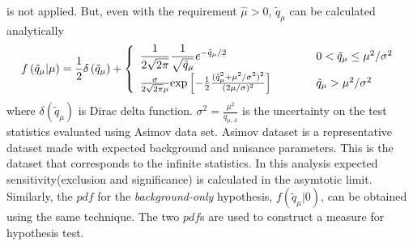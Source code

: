 \begin{itemize}
is not applied. But, even with the requirement $\hat{\mu}>0$, 
$\tilde{q}_\mu$ can be calculated analytically
\begin{eqnarray} 
f\left( \tilde{q}_\mu | \mu \right) 
= 
\frac{1}{2} \delta \left( \tilde{q}_\mu \right)  + 
\left\{ \begin{array}{l l}
\displaystyle
\frac{1}{2\sqrt{2\pi}} \frac{1}{\sqrt{\tilde{q}_\mu}}  e^{-\tilde{q}_\mu/2}
   & \quad \quad \quad 0 < \tilde{q}_\mu \le \mu^2/\sigma^2 \\
\frac{\sigma}{2\sqrt{2\pi}\mu} 
   \textrm{exp}\left[-\frac{1}{2} \frac{(\tilde{q}_\mu^2+\mu^2/\sigma^2)^2}{(2\mu/\sigma)^2}   \right]
   & \quad \quad \quad \tilde{q}_\mu > \mu^2/\sigma^2 
\end{array} \right.
\end{eqnarray} 
where $\delta(\tilde{q}_\mu)$ is Dirac delta function.
$\displaystyle \sigma^2 = \frac{\mu^2}{q_{\mu,A}}$ 
is the uncertainty on the test statistics evaluated using Asimov data set. 
Asimov dataset is a representative dataset made with expected background 
and nuisance parameters. This is the dataset that corresponds to the infinite statistics. 
In this analysis expected sensitivity(exclusion and significance) is calculated 
in the asymtotic limit.
Similarly, the $pdf$ for the \textit{background-only} hypothesis,
$f\left( \tilde{q}_\mu | 0 \right)$, can be obtained 
using the same technique. The two $pdf$s are used to construct 
a measure for hypothesis test.


\end{itemize}
